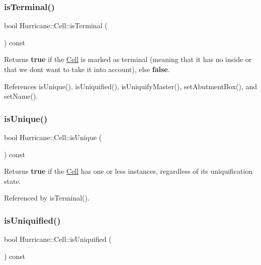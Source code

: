 \subsubsection{\texorpdfstring{is\+Terminal()}{isTerminal()}}
{\footnotesize\ttfamily bool Hurricane\+::\+Cell\+::is\+Terminal (\begin{DoxyParamCaption}{ }\end{DoxyParamCaption}) const\hspace{0.3cm}{\ttfamily [inline]}}

Returns {\bfseries true} if the \hyperlink{classHurricane_1_1Cell}{Cell} is marked as terminal (meaning that it has no inside or that we dont want to take it into account), else {\bfseries false}. 

References is\+Unique(), is\+Uniquified(), is\+Uniquify\+Master(), set\+Abutment\+Box(), and set\+Name().

\mbox{\label{classHurricane_1_1Cell_a6c2f2fd9f6f6e0578937a90c0c37a507}} 
\subsubsection{\texorpdfstring{is\+Unique()}{isUnique()}}
{\footnotesize\ttfamily bool Hurricane\+::\+Cell\+::is\+Unique (\begin{DoxyParamCaption}{ }\end{DoxyParamCaption}) const}

Returns {\bfseries true} if the \hyperlink{classHurricane_1_1Cell}{Cell} has one or less instances, regardless of it\textquotesingle{}s uniquification state. 

Referenced by is\+Terminal().

\mbox{\label{classHurricane_1_1Cell_a86c21867e9ce896eae72fd2999ce8a2d}} 
\subsubsection{\texorpdfstring{is\+Uniquified()}{isUniquified()}}
{\footnotesize\ttfamily bool Hurricane\+::\+Cell\+::is\+Uniquified (\begin{DoxyParamCaption}{ }\end{DoxyParamCaption}) const}

